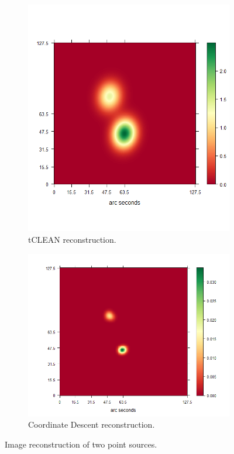 \begin{figure}[h]
	\centering
	\begin{subfigure}[b]{0.4\linewidth}
		\includegraphics[width=\linewidth]{./chapters/20.results/points/tCLEAN.png}
		\caption{tCLEAN reconstruction.}
		\label{results:points:tclean}
	\end{subfigure}
	\begin{subfigure}[b]{0.4\linewidth}
		\includegraphics[width=\linewidth]{./chapters/20.results/points/cd.png}
		\caption{Coordinate Descent reconstruction.}
		\label{results:points:cd}
	\end{subfigure}
	
	\caption{Image reconstruction of two point sources.}
	\label{results:point}
\end{figure}

